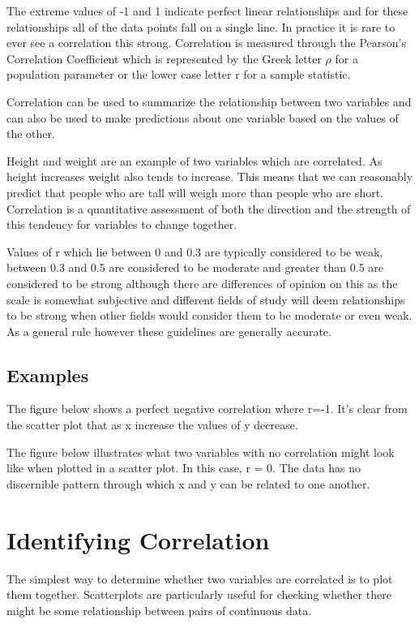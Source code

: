 \documentclass[
]{book}
\begin{document}
The extreme values of -1 and 1 indicate perfect linear relationships and for these relationships all of the data points fall on a single line. In practice it is rare to ever see a correlation this strong. Correlation is measured through the Pearson's Correlation Coefficient which is represented by the Greek letter \(\rho\) for a population parameter or the lower case letter r for a sample statistic.

Correlation can be used to summarize the relationship between two variables and can also be used to make predictions about one variable based on the values of the other.

Height and weight are an example of two variables which are correlated. As height increases weight also tends to increase. This means that we can reasonably predict that people who are tall will weigh more than people who are short. Correlation is a quantitative assessment of both the direction and the strength of this tendency for variables to change together.

Values of r which lie between 0 and 0.3 are typically considered to be weak, between 0.3 and 0.5 are considered to be moderate and greater than 0.5 are considered to be strong although there are differences of opinion on this as the scale is somewhat subjective and different fields of study will deem relationships to be strong when other fields would consider them to be moderate or even weak. As a general rule however these guidelines are generally accurate.

\hypertarget{examples}{%
\subsection{Examples}\label{examples}}

The figure below shows a perfect negative correlation where r=-1. It's clear from the scatter plot that as x increase the values of y decrease.

The figure below illustrates what two variables with no correlation might look like when plotted in a scatter plot. In this case, r = 0. The data has no discernible pattern through which x and y can be related to one another.

\hypertarget{identifying-correlation}{%
\section{Identifying Correlation}\label{identifying-correlation}}

The simplest way to determine whether two variables are correlated is to plot them together. Scatterplots are particularly useful for checking whether there might be some relationship between pairs of continuous data.
\end{document}
